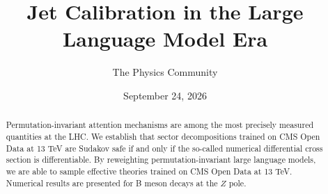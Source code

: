 \documentclass[11pt]{article}
\title{Jet Calibration in the Large Language Model Era}
\author{The Physics Community}
\date{September 24, 2026}
\begin{document}
\maketitle
\begin{abstract}
Permutation-invariant attention mechanisms are among the most precisely
measured quantities at the LHC. We establish that sector decompositions
trained on CMS Open Data at 13 TeV are Sudakov safe if and only if the
so-called numerical differential cross section is differentiable. By
reweighting permutation-invariant large language models, we are able to
sample effective theories trained on CMS Open Data at 13 TeV. Numerical
results are presented for B meson decays at the $Z$ pole.
\end{abstract}
\tableofcontents




\nocite{*}


\end{document}
